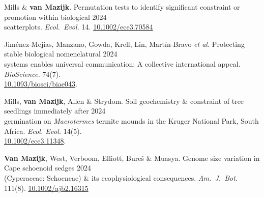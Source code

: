 

Mills \& \textbf{van Mazijk}.
Permutation tests to identify significant constraint or promotion within biological \hfill 2024 \\
\hspace{2em} scatterplots.
  \textit{Ecol.~Evol.}
  14. \href{http://dx.doi.org/10.1002/ece3.70584}{10.1002/ece3.70584}

Jiménez-Mejías, Manzano, Gowda, Krell, Lin, Martín-Bravo \textit{et al.}
Protecting stable biological nomenclatural                                          \hfill 2024 \\
\hspace{2em} systems enables universal communication: A collective international appeal.
  \textit{BioScience.}
  74(7). \\
  \hspace{2em} \href{https://doi.org/10.1093/biosci/biae043}{10.1093/biosci/biae043}.

Mills, \textbf{van Mazijk}, Allen \& Strydom.
Soil geochemistry \& constraint of tree seedlings immediately after
                                                              \hfill 2024 \\
\hspace{2em} germination on \textit{Macrotermes} termite
  mounds in the Kruger National Park, South Africa.
  \textit{Ecol. Evol.} 14(5). \\
  \hspace{2em} \href{http://dx.doi.org/10.1002/ece3.11348}{10.1002/ece3.11348}.

\textbf{Van Mazijk}, West, Verboom, Elliott, Bureš \& Muasya.
Genome size variation in Cape schoenoid sedges                \hfill 2024 \\
\hspace{2em} (Cyperaceae: Schoeneae) \& its ecophysiological consequences.
  \textit{Am.~J.~Bot.}
  111(8).
  \href{http://dx.doi.org/10.1002/ajb2.16315}{10.1002/ajb2.16315}

